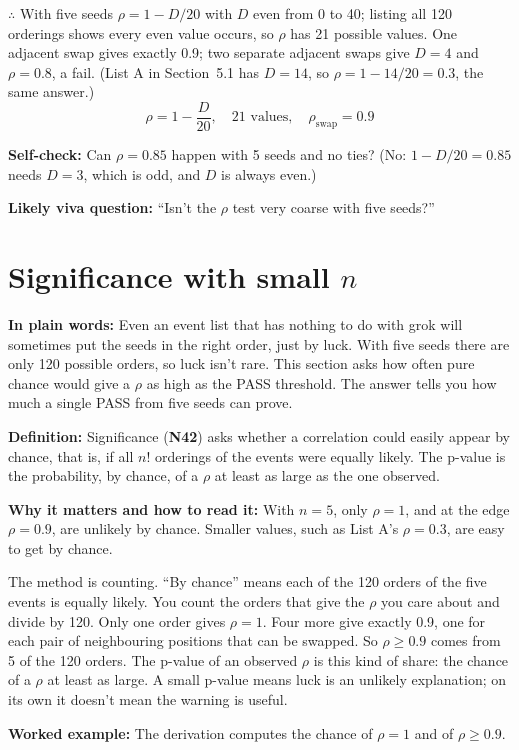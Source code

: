 \documentclass[11pt,a4paper,oneside,openany]{report}
\newcommand{\gl}[1]{\textbf{#1}}   %
\newcommand{\fplain}{\textbf{In plain words:} }
\newcommand{\fdef}{\textbf{Definition:} }
\newcommand{\fread}{\par\textbf{Why it matters and how to read it:} }
\newcommand{\fex}{\par\textbf{Worked example:} }
\newcommand{\fself}{\par\textbf{Self-check:} }
\newcommand{\fviva}{\par\textbf{Likely viva question:} }
\begin{document}
$\therefore$ With five seeds $\rho = 1 - D/20$ with $D$ even from 0 to 40; listing all 120 orderings shows every even value occurs, so $\rho$ has 21 possible values. One adjacent swap gives exactly 0.9; two separate adjacent swaps give $D = 4$ and $\rho = 0.8$, a fail. (List A in Section~5.1 has $D = 14$, so $\rho = 1 - 14/20 = 0.3$, the same answer.)
\[\boxed{\rho = 1 - \frac{D}{20}, \quad 21 \text{ values}, \quad \rho_{\mathrm{swap}} = 0.9}\]

\fself Can $\rho = 0.85$ happen with 5 seeds and no ties? (No: $1 - D/20 = 0.85$ needs $D = 3$, which is odd, and $D$ is always even.)
\fviva ``Isn't the $\rho$ test very coarse with five seeds?''

\section{Significance with small $n$}
\fplain Even an event list that has nothing to do with grok will sometimes put the seeds in the right order, just by luck. With five seeds there are only 120 possible orders, so luck isn't rare. This section asks how often pure chance would give a $\rho$ as high as the PASS threshold. The answer tells you how much a single PASS from five seeds can prove.

\fdef Significance (\gl{N42}) asks whether a correlation could easily appear by chance, that is, if all $n!$ orderings of the events were equally likely. The p-value is the probability, by chance, of a $\rho$ at least as large as the one observed.
\fread With $n = 5$, only $\rho = 1$, and at the edge $\rho = 0.9$, are unlikely by chance. Smaller values, such as List A's $\rho = 0.3$, are easy to get by chance.

The method is counting. ``By chance'' means each of the 120 orders of the five events is equally likely. You count the orders that give the $\rho$ you care about and divide by 120. Only one order gives $\rho = 1$. Four more give exactly 0.9, one for each pair of neighbouring positions that can be swapped. So $\rho \ge 0.9$ comes from 5 of the 120 orders. The p-value of an observed $\rho$ is this kind of share: the chance of a $\rho$ at least as large. A small p-value means luck is an unlikely explanation; on its own it doesn't mean the warning is useful.

\fex The derivation computes the chance of $\rho = 1$ and of $\rho \ge 0.9$.
\end{document}
